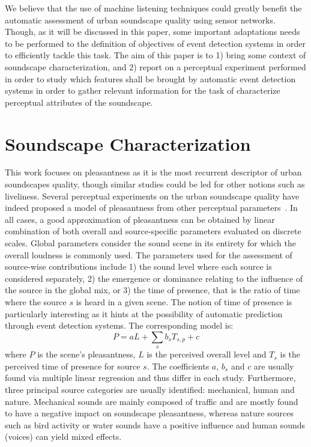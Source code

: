 \documentclass{article}
\begin{document}
\begin{sloppy}
We believe that the use of machine listening techniques could greatly benefit the automatic assessment of urban soundscape quality using sensor networks. Though, as it will be discussed in this paper, some important adaptations needs to be performed to the definition of objectives of event detection systems in order to efficiently tackle this task. The aim of this paper is to 1) bring some context of soundscape characterization, and 2) report on a perceptual experiment performed in order to study which features shall be brought by automatic event detection systems in order to gather relevant information for the task of characterize perceptual attributes of the soundscape.


\section{Soundscape Characterization}
\label{sec:char}
This work focuses on pleasantness as it is the most recurrent descriptor of urban soundscapes quality, though similar studies could be led for other notions such as liveliness. Several perceptual experiments on the urban soundscape quality have indeed proposed a model of pleasantness from other perceptual parameters~\cite{nilsson2007, axelsson2010, aumond2017, ricciardi2014}. In all cases, a good approximation of pleasantness can be obtained by linear combination of both overall and source-specific parameters evaluated on discrete scales. Global parameters consider the sound scene in its entirety for which the overall loudness is commonly used. The parameters used for the assessment of source-wise contributions include 1) the sound level where each source is considered separately, 2) the emergence or dominance relating to the influence of the source in the global mix, or 3) the time of presence, that is the ratio of time where the source $s$ is heard in a given scene. The notion of time of presence is particularly interesting as it hints at the possibility of automatic prediction through event detection systems. The corresponding model is:
\begin{equation}
P = aL + \sum_s b_sT_{s,p} + c
\end{equation}
where $P$ is the scene's pleasantness, $L$ is the perceived overall level and $T_s$ is the perceived time of presence for source $s$. The coefficients $a$, $b_s$ and $c$ are usually found via multiple linear regression and thus differ in each study.
Furthermore, three principal source categories are usually identified: mechanical, human and nature. Mechanical sounds are mainly composed of traffic and are mostly found to have a negative impact on soundscape pleasantness, whereas nature sources such as bird activity or water sounds have a positive influence and human sounds (voices) can yield mixed effects.


\end{sloppy}
\end{document}

